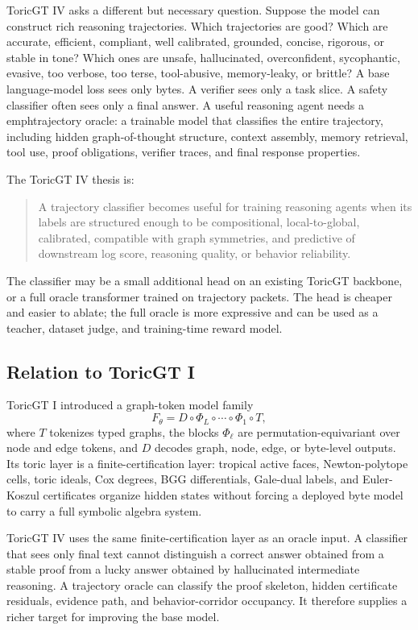 \documentclass[11pt]{article}
\numberwithin{equation}{section}
\begin{document}
ToricGT IV asks a different but necessary question. Suppose the model can construct rich reasoning trajectories. Which trajectories are good? Which are accurate, efficient, compliant, well calibrated, grounded, concise, rigorous, or stable in tone? Which ones are unsafe, hallucinated, overconfident, sycophantic, evasive, too verbose, too terse, tool-abusive, memory-leaky, or brittle? A base language-model loss sees only bytes. A verifier sees only a task slice. A safety classifier often sees only a final answer. A useful reasoning agent needs a \\emph{trajectory oracle}: a trainable model that classifies the entire trajectory, including hidden graph-of-thought structure, context assembly, memory retrieval, tool use, proof obligations, verifier traces, and final response properties.

The ToricGT IV thesis is:
\begin{quote}
A trajectory classifier becomes useful for training reasoning agents when its labels are structured enough to be compositional, local-to-global, calibrated, compatible with graph symmetries, and predictive of downstream log score, reasoning quality, or behavior reliability.
\end{quote}
The classifier may be a small additional head on an existing ToricGT backbone, or a full oracle transformer trained on trajectory packets. The head is cheaper and easier to ablate; the full oracle is more expressive and can be used as a teacher, dataset judge, and training-time reward model.

\subsection{Relation to ToricGT I}
ToricGT I introduced a graph-token model family
\begin{equation}
F_\theta = D\circ \Phi_L\circ\cdots\circ\Phi_1\circ T,
\end{equation}
where $T$ tokenizes typed graphs, the blocks $\Phi_\ell$ are permutation-equivariant over node and edge tokens, and $D$ decodes graph, node, edge, or byte-level outputs. Its toric layer is a finite-certification layer: tropical active faces, Newton-polytope cells, toric ideals, Cox degrees, BGG differentials, Gale-dual labels, and Euler-Koszul certificates organize hidden states without forcing a deployed byte model to carry a full symbolic algebra system.

ToricGT IV uses the same finite-certification layer as an oracle input. A classifier that sees only final text cannot distinguish a correct answer obtained from a stable proof from a lucky answer obtained by hallucinated intermediate reasoning. A trajectory oracle can classify the proof skeleton, hidden certificate residuals, evidence path, and behavior-corridor occupancy. It therefore supplies a richer target for improving the base model.
\end{document}
